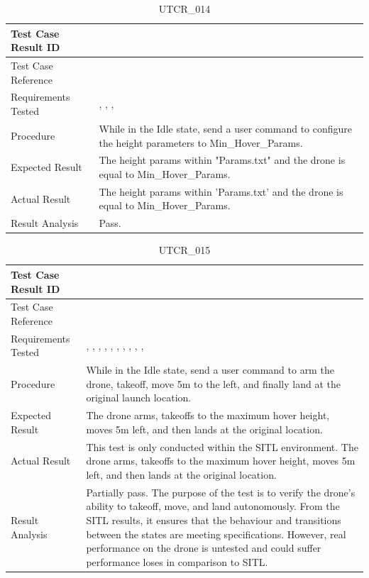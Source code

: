 \documentclass[12pt, titlepage]{article}
\begin{document}
\begin{table}[!h]
\begin{center}
\caption {UTCR\_014}
\label{tab:UTCR_014}
\begin{tabular}{ | m{3.2cm} | m{12.2cm} | } 
\hline
Test Case Result ID & \nameref{tab:UTCR_014} \\ 
\hline
Test Case Reference & \nameref{tab:UTC_014}  \\ 
\hline
Requirements Tested & \nameref{STA_004}, \nameref{GEN_003}, \nameref{TRANS_003}, \nameref{TRANS_015} \\ 
\hline
Procedure & While in the Idle state, send a user command to configure the height parameters to Min\_Hover\_Params. \\ 
\hline
Expected Result & The height params within "Params.txt" and the drone is equal to Min\_Hover\_Params. \\
\hline
Actual Result & The height params within 'Params.txt' and the drone is equal to Min\_Hover\_Params. \\
\hline
Result Analysis & Pass. \\ 
\hline
\end{tabular}
\end{center}
\end{table}

\begin{table}[!h]
\begin{center}
\caption {UTCR\_015}
\label{tab:UTCR_015}
\begin{tabular}{ | m{3.2cm} | m{12.2cm} | } 
\hline
Test Case Result ID & \nameref{tab:UTCR_015} \\ 
\hline
Test Case Reference & \nameref{tab:UTC_015}  \\ 
\hline
Requirements Tested & \nameref{STA_000}, \nameref{STA_001}, \nameref{STA_004}, \nameref{STA_011}, \nameref{STA_012}, \nameref{STA_013}, \nameref{TRANS_003}, \nameref{TRANS_009}, \nameref{TRANS_012}, \nameref{TRANS_013}, \nameref{TRANS_014} \\ 
\hline
Procedure & While in the Idle state, send a user command to arm the drone, takeoff, move 5m to the left, and finally land at the original launch location. \\ 
\hline
Expected Result & The drone arms, takeoffs to the maximum hover height, moves 5m left, and then lands at the original location. \\
\hline
Actual Result & This test is only conducted within the SITL environment. The drone arms, takeoffs to the maximum hover height, moves 5m left, and then lands at the original location. \\
\hline
Result Analysis & Partially pass. The purpose of the test is to verify the drone's ability to takeoff, move, and land autonomously. From the SITL results, it ensures that the behaviour and transitions between the states are meeting specifications. However, real performance on the drone is untested and could suffer performance loses in comparison to SITL. \\ 
\hline
\end{tabular}
\end{center}
\end{table}
\end{document}
